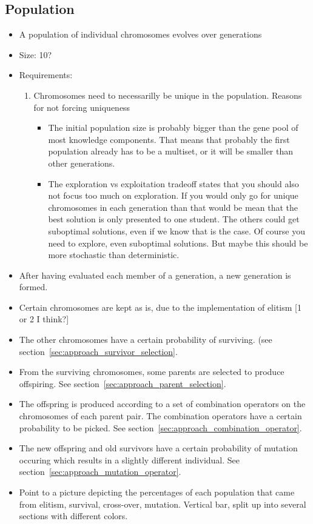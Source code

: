 \subsection{Population}
\begin{itemize}
	\item A population of individual chromosomes evolves over generations
	\item Size: 10?
	\item Requirements:
		\begin{enumerate}
			\item Chromosomes need to necessarilly be unique in the
				population. Reasons for not forcing uniqueness
				\begin{itemize}
					\item The initial population size is probably bigger than
						the gene pool of most knowledge components. That means
						that probably the first population already has to be a
						multiset, or it will be smaller than other generations.
					\item The exploration vs exploitation tradeoff states that
						you should also not focus too much on exploration. If
						you would only go for unique chromosomes in each
						generation than that would be mean that the best
						solution is only presented to one student. The others
						could get suboptimal solutions, even if we know that is
						the case. Of course you need to explore, even
						suboptimal solutions. But maybe this should be more
						stochastic than deterministic.
				\end{itemize}
		\end{enumerate}
	\item After having evaluated each member of a generation, a new generation
		is formed.
	\item Certain chromosomes are kept as is, due to the implementation of elitism
		[1 or 2 I think?]
	\item The other chromosomes have a certain probability of surviving. (see
		section~\ref{sec:approach_survivor_selection}.
	\item From the surviving chromosomes, some parents are selected to produce
		offspiring. See section~\ref{sec:approach_parent_selection}.
	\item The offspring is produced according to a set of combination operators
		on the chromosomes of each parent pair. The combination operators have
		a certain probability to be picked. See
		section~\ref{sec:approach_combination_operator}.
	\item The new offspring and old survivors have a certain probability of
		mutation occuring which results in a slightly different individual. See
		section~\ref{sec:approach_mutation_operator}.
	\item Point to a picture depicting the percentages of each population that
		came from elitism, survival, cross-over, mutation. Vertical bar, split
		up into several sections with different colors.
\end{itemize}
